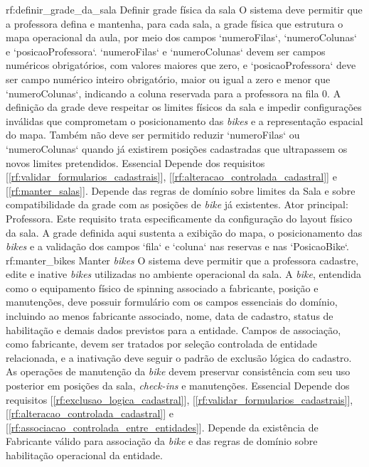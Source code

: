 \reqfuncfull
{rf:definir_grade_da_sala}
{Definir grade física da sala}
{O sistema deve permitir que a professora defina e mantenha, para cada sala, a grade física que estrutura o mapa operacional da aula, por meio dos campos `numeroFilas`, `numeroColunas` e `posicaoProfessora`. `numeroFilas` e `numeroColunas` devem ser campos numéricos obrigatórios, com valores maiores que zero, e `posicaoProfessora` deve ser campo numérico inteiro obrigatório, maior ou igual a zero e menor que `numeroColunas`, indicando a coluna reservada para a professora na fila 0. A definição da grade deve respeitar os limites físicos da sala e impedir configurações inválidas que comprometam o posicionamento das \textit{bikes} e a representação espacial do mapa. Também não deve ser permitido reduzir `numeroFilas` ou `numeroColunas` quando já existirem posições cadastradas que ultrapassem os novos limites pretendidos.}
{Essencial}
{Depende dos requisitos [\ref{rf:validar_formularios_cadastrais}], [\ref{rf:alteracao_controlada_cadastral}] e [\ref{rf:manter_salas}]. Depende das regras de domínio sobre limites da Sala e sobre compatibilidade da grade com as posições de \textit{bike} já existentes.}
{Ator principal: Professora. Este requisito trata especificamente da configuração do layout físico da sala. A grade definida aqui sustenta a exibição do mapa, o posicionamento das \textit{bikes} e a validação dos campos `fila` e `coluna` nas reservas e nas `PosicaoBike`.}
\reqfuncfull
{rf:manter_bikes}
{Manter \textit{bikes}}
{O sistema deve permitir que a professora cadastre, edite e inative \textit{bikes} utilizadas no ambiente operacional da sala. A \textit{bike}, entendida como o equipamento físico de spinning associado a fabricante, posição e manutenções, deve possuir formulário com os campos essenciais do domínio, incluindo ao menos fabricante associado, nome, data de cadastro, status de habilitação e demais dados previstos para a entidade. Campos de associação, como fabricante, devem ser tratados por seleção controlada de entidade relacionada, e a inativação deve seguir o padrão de exclusão lógica do cadastro. As operações de manutenção da \textit{bike} devem preservar consistência com seu uso posterior em posições da sala, \textit{check-ins} e manutenções.}
{Essencial}
{Depende dos requisitos [\ref{rf:exclusao_logica_cadastral}], [\ref{rf:validar_formularios_cadastrais}], [\ref{rf:alteracao_controlada_cadastral}] e [\ref{rf:associacao_controlada_entre_entidades}]. Depende da existência de Fabricante válido para associação da \textit{bike} e das regras de domínio sobre habilitação operacional da entidade.}
